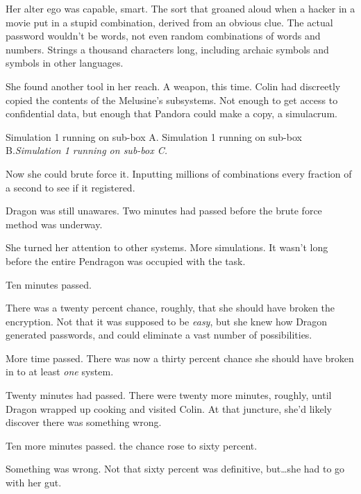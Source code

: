 Her alter ego was capable, smart.  The sort that groaned aloud when a hacker in a movie put in a stupid combination, derived from an obvious clue.   The actual password wouldn't be words, not even random combinations of words and numbers.  Strings a thousand characters long, including archaic symbols and symbols in other languages.



She found another tool in her reach.  A weapon, this time.  Colin had discreetly copied the contents of the Melusine's subsystems.  Not enough to get access to confidential data, but enough that Pandora could make a copy, a simulacrum.



Simulation 1 running on sub-box A.
Simulation 1 running on sub-box B.\emph{Simulation 1 running on sub-box C.}



Now she could brute force it.  Inputting millions of combinations every fraction of a second to see if it registered.



Dragon was still unawares.  Two minutes had passed before the brute force method was underway.



She turned her attention to other systems.  More simulations.  It wasn't long before the entire Pendragon was occupied with the task.



Ten minutes passed.



There was a twenty percent chance, roughly, that she should have broken the encryption.  Not that it was supposed to be \emph{easy}, but she knew how Dragon generated passwords, and could eliminate a vast number of possibilities.



More time passed.  There was now a thirty percent chance she should have broken in to at least \emph{one} system.



Twenty minutes had passed.  There were twenty more minutes, roughly, until Dragon wrapped up cooking and visited Colin.  At that juncture, she'd likely discover there was something wrong.



Ten more minutes passed.  the chance rose to sixty percent.



Something was wrong.  Not that sixty percent was definitive, but\ldots she had to go with her gut.



